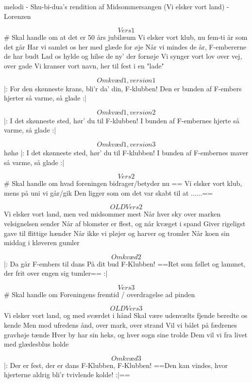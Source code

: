 melodi - Shu-bi-dua's rendition af Midsommersangen (Vi elsker vort land)
- Lorenzen

\[Vers 1\] # Skal handle om at det er 50 års jubilæum
Vi elsker vort klub, nu fem-ti år som det går
Har vi samlet os her med glæde for øje
Når vi mindes de år, F-embererne de har budt
Lad os hylde og hilse de ny' der fornøje
Vi synger vort lov over vej, over gade
Vi kranser vort navn, her til fest i en "lade"

\[Omkvæd 1, version 1\]
|: For den skønneste krans, bli'r da' din, F-klubben!
Den er bunden af F-embers hjerter så varme, så glade :|

\[Omkvæd 1, version 2\]
|: I det skønneste sted, hør' du til F-klubben!
I bunden af F-embernes hjerte så varme, så glade :|

\[Omkvæd 1, version 3\] høhø
|: I det skønneste sted, hør' du til F-klubben!
I bunden af F-embernes maver så varme, så glade :|

\[Vers 2\] # Skal handle om hvad foreningen bidrager/betyder nu
== Vi elsker vort klub, mens på uni vi går/gik
Den ligger som om det var skabt til at ......==

\[OLD Vers 2\]
Vi elsker vort land, men ved midsommer mest
Når hver sky over marken velsignelsen sender
Når af blomster er flest, og når kvæget i spand
Giver rigeligst gave til flittige hænder
Når ikke vi pløjer og harver og tromler
Når koen sin middag i kløveren gumler



\[Omkvæd 2\]
|: Da går F-embers til dans  
På dit bud F-Klubben!  
==Ret som føllet og lammet, der frit over engen sig tumler== :|


\[Vers 3\] # Skal handle om Foreningens fremtid / overdragelse ad pinden

\[OLD Vers 3\]
Vi elsker vort land, og med sværdet i hånd  
Skal være udenvælts fjende beredte os kende
Men mod ufredens ånd, over mark, over strand
Vil vi bålet på fædrenes gravhøje tænde
Hver by har sin heks, og hver sogn sine trolde
Dem vil vi fra livet med glædesblus holde

\[Omkvæd 3\]
|: Der er fest, der er dans F-Klubben, F-Klubben!  
==Den kan vindes, hvor hjerterne aldrig bli'r tvivlende kolde! :|==